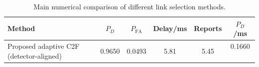 \begin{table}[t]
    \centering
    \caption{Main numerical comparison of different link selection methods.}
    \label{tab:main_summary}
    \begin{tabular}{l c c c c c}
        \hline
        Method & $P_D$ & $P_{\mathrm{FA}}$ & Delay/ms & Reports & $P_D$/ms \\
        \hline
        Proposed adaptive C2F (detector-aligned) & 0.9650 & 0.0493 & 5.81 & 5.45 & 0.1660 \
        \hline
    \end{tabular}
\end{table}
